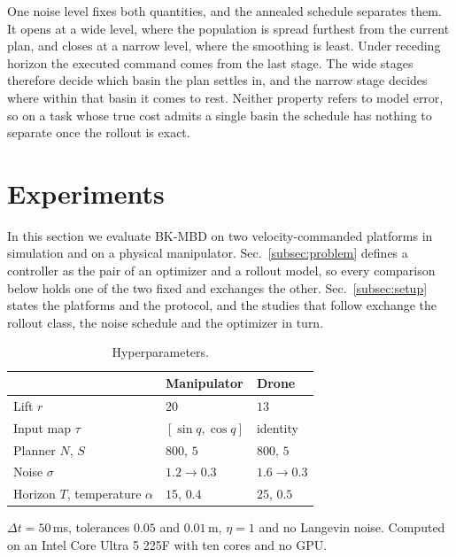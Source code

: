 \documentclass[letterpaper,10pt,conference]{ieeeconf}
\newcommand{\bkmbd}{\textsc{BK-MBD}}
\begin{document}
One noise level fixes both quantities, and the annealed schedule separates them.
It opens at a wide level, where the population is spread furthest from the current plan, and closes at a narrow level, where the smoothing is least.
Under receding horizon the executed command comes from the last stage.
The wide stages therefore decide which basin the plan settles in, and the narrow stage decides where within that basin it comes to rest.
Neither property refers to model error, so on a task whose true cost admits a single basin the schedule has nothing to separate once the rollout is exact.

\section{Experiments}\label{sec:exp}

In this section we evaluate \bkmbd{} on two velocity-commanded platforms in simulation and on a physical manipulator.
Sec.~\ref{subsec:problem} defines a controller as the pair of an optimizer and a rollout model, so every comparison below holds one of the two fixed and exchanges the other.
Sec.~\ref{subsec:setup} states the platforms and the protocol, and the studies that follow exchange the rollout class, the noise schedule and the optimizer in turn.

\begin{table}[t]
\centering
\begin{threeparttable}
\caption{Hyperparameters.}
\label{tab:hyper}
\footnotesize
\begin{tabularx}{\linewidth}{l Y Y}
\toprule
& Manipulator & Drone \\
\midrule
Lift $r$ & $20$ & $13$ \\
Input map $\tau$ & $[\sin q, \cos q]$ & identity \\
Planner $N$, $S$ & $800$, $5$ & $800$, $5$ \\
Noise $\sigma$ & $1.2 \to 0.3$ & $1.6 \to 0.3$ \\
Horizon $T$, temperature $\alpha$ & $15$, $0.4$ & $25$, $0.5$ \\
\bottomrule
\end{tabularx}
\begin{tablenotes}[flushleft]\scriptsize
\item $\Delta t = 50$\,ms, tolerances $0.05$ and $0.01$\,m, $\eta = 1$ and no Langevin noise.
Computed on an Intel Core Ultra 5 225F with ten cores and no GPU.
\end{tablenotes}
\end{threeparttable}
\end{table}
\end{document}
